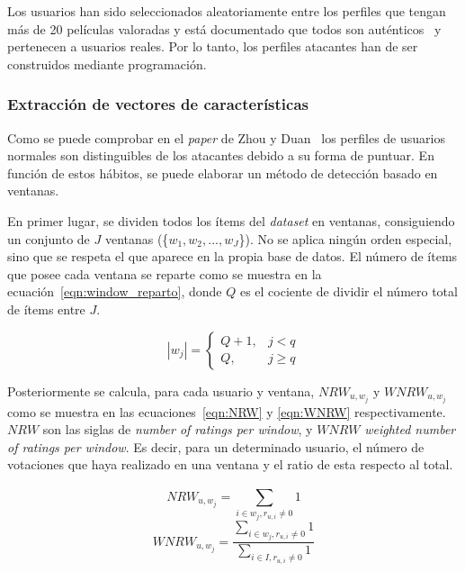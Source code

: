 Los usuarios han sido seleccionados aleatoriamente entre los perfiles que tengan más de 20 películas valoradas y está documentado que todos son auténticos~\cite{zhou2021SemisupervisedRecommendationAttack} y pertenecen a usuarios reales. Por lo tanto, los perfiles atacantes han de ser construidos mediante programación.

\subsubsection{Extracción de vectores de características}

Como se puede comprobar en el \textit{paper} de Zhou y Duan~\cite{zhou2021SemisupervisedRecommendationAttack} los perfiles de usuarios normales son distinguibles de los atacantes debido a su forma de puntuar. En función de estos hábitos, se puede elaborar un método de detección basado en ventanas.

En primer lugar, se dividen todos los ítems del \textit{dataset} en ventanas, consiguiendo un conjunto de $J$ ventanas (\{$w_1, w_2, ..., w_J$\}). No se aplica ningún orden especial, sino que se respeta el que aparece en la propia base de datos. El número de ítems que posee cada ventana se reparte como se muestra en la ecuación~\ref{eqn:window_reparto}, donde $Q$ es el cociente de dividir el número total de ítems entre $J$.
	
\[|w_j| = \left\{ \begin{array}{lr} Q + 1, & j < q\\ Q, & j \ge q \label{eqn:window_reparto} \end{array} \right. \] 

Posteriormente se calcula, para cada usuario y ventana, $NRW_{u, w_j}$ y  $WNRW_{u, w_j}$ como se muestra en las ecuaciones~\ref{eqn:NRW} y \ref{eqn:WNRW} respectivamente. $NRW$ son las siglas de \textit{number of ratings per window}, y $WNRW$ \textit{weighted number of ratings per window}. Es decir, para un determinado usuario, el número de votaciones que haya realizado en una ventana y el ratio de esta respecto al total.

\begin{equation}\label{eqn:NRW} NRW_{u, w_j} = \sum_{i\in w_j, r_{u,i} \ne 0}^{} 1 \end{equation}
\begin{equation}\label{eqn:WNRW} WNRW_{u, w_j} = \frac{\sum_{i\in w_j, r_{u,i} \ne 0}^{} 1}{\sum_{i\in I, r_{u,i} \ne 0}^{} 1} \end{equation}

